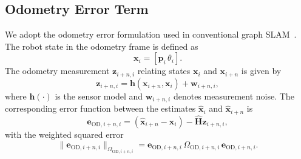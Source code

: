 \documentclass[conference]{IEEEtran}
\begin{document}
\subsection{Odometry Error Term}
We adopt the odometry error formulation used in conventional graph SLAM~\cite{graph_slam}.
The robot state in the odometry frame is defined as
\begin{equation}
    \mathbf{x}_i = [\mathbf{p}_i\, \theta_i].
\end{equation}
The odometry measurement $\mathbf{z}_{i+n,i}$ relating states $\mathbf{x}_i$ and $\mathbf{x}_{i+n}$ is given by
\begin{equation}
    \mathbf{z}_{i+n,i} = \mathbf{h}(\mathbf{x}_{i+n}, \mathbf{x}_{i}) + \mathbf{w}_{i+n,i},
\end{equation}
where $\mathbf{h}(\cdot)$ is the sensor model and $\mathbf{w}_{i+n,i}$ denotes measurement noise.
The corresponding error function between the estimates $\mathbf{\hat{x}}_i$ and $\mathbf{\hat{x}}_{i+n}$ is
\begin{equation}
    \mathbf{e}_{\mathrm{OD},i+n,i} = \left(\mathbf{\hat{x}}_{i+n} - \mathbf{\hat{x}}_{i}\right) - \mathbf{\hat{H}}\mathbf{z}_{i+n,i},
\end{equation}
with the weighted squared error
\begin{equation}
    \|\mathbf{e}_{\mathrm{OD},i+n,i}\|_{\Omega_{\mathrm{OD},i+n,i}} = \mathbf{e}_{\mathrm{OD},i+n,i}\, \Omega_{\mathrm{OD},i+n,i}\, \mathbf{e}_{\mathrm{OD},i+n,i}.
\end{equation}
\end{document}
